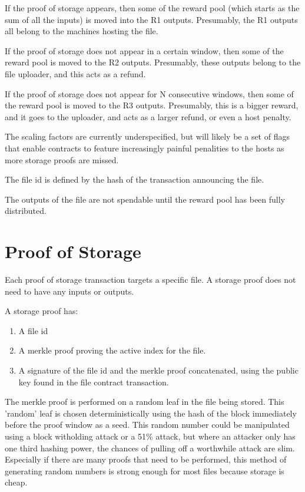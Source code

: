\documentclass[twocolumn]{article}
\begin{document}
If the proof of storage appears, then some of the reward pool (which starts as the sum of all the inputs) is moved into the R1 outputs.
Presumably, the R1 outputs all belong to the machines hosting the file.

If the proof of storage does not appear in a certain window, then some of the reward pool is moved to the R2 outputs.
Presumably, these outputs belong to the file uploader, and this acts as a refund.

If the proof of storage does not appear for N consecutive windows, then some of the reward pool is moved to the R3 outputs.
Presumably, this is a bigger reward, and it goes to the uploader, and acts as a larger refund, or even a host penalty.

The scaling factors are currently underspecified, but will likely be a set of flags that enable contracts to feature increasingly painful penalities to the hosts as more storage proofs are missed.

The file id is defined by the hash of the transaction announcing the file.

The outputs of the file are not spendable until the reward pool has been fully distributed.

\section{Proof of Storage}
Each proof of storage transaction targets a specific file.
A storage proof does not need to have any inputs or outputs.

A storage proof has:
\begin{enumerate}
	\item A file id
	\item A merkle proof proving the active index for the file.
	\item A signature of the file id and the merkle proof concatenated, using the public key found in the file contract transaction.
\end{enumerate}

The merkle proof is performed on a random leaf in the file being stored.
This 'random' leaf is chosen deterministically using the hash of the block immediately before the proof window as a seed.
This random number could be manipulated using a block witholding attack or a 51\% attack, but where an attacker only has one third hashing power, the chances of pulling off a worthwhile attack are slim.
Especially if there are many proofs that need to be performed, this method of generating random numbers is strong enough for most files because storage is cheap.
\end{document}
